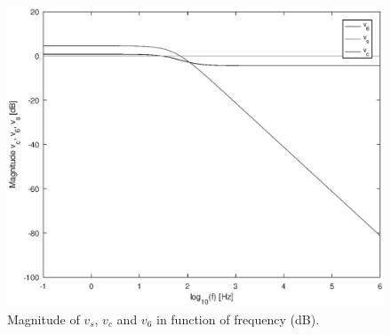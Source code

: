\begin{figure}[h!] \centering
\includegraphics[width=0.7\linewidth]{MagnitudedB.eps}
\caption{Magnitude of $v_s$, $v_c$ and $v_6$ in function of frequency (dB).}
\label{fig:magnitude}
\end{figure}

